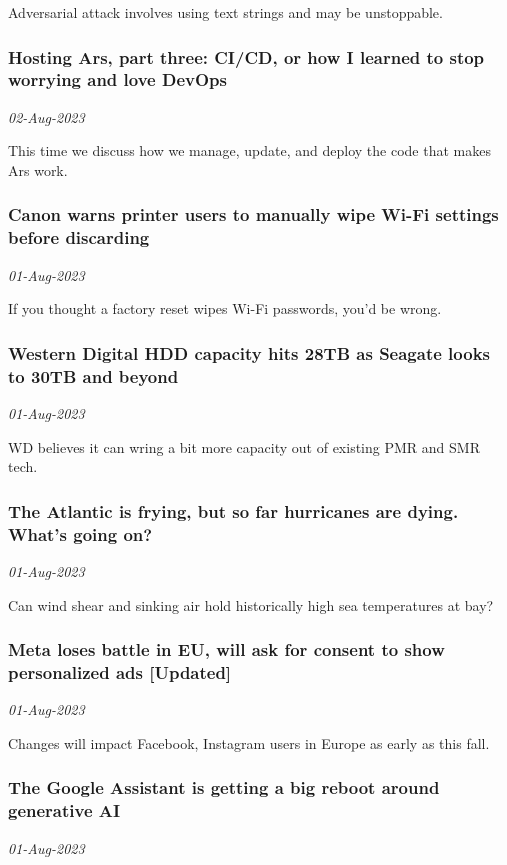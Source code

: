 Adversarial attack involves using text strings and may be unstoppable.
\subsubsection{Hosting Ars, part three: CI/CD, or how I learned to stop worrying and love DevOps \href{https://arstechnica.com/?p=1956002}{}}
\textit{02-Aug-2023}

This time we discuss how we manage, update, and deploy the code that makes Ars work.
\subsubsection{Canon warns printer users to manually wipe Wi-Fi settings before discarding \href{https://arstechnica.com/?p=1958242}{}}
\textit{01-Aug-2023}

If you thought a factory reset wipes Wi-Fi passwords, you'd be wrong.
\subsubsection{Western Digital HDD capacity hits 28TB as Seagate looks to 30TB and beyond \href{https://arstechnica.com/?p=1958232}{}}
\textit{01-Aug-2023}

WD believes it can wring a bit more capacity out of existing PMR and SMR tech.
\subsubsection{The Atlantic is frying, but so far hurricanes are dying. What’s going on? \href{https://arstechnica.com/?p=1958160}{}}
\textit{01-Aug-2023}

Can wind shear and sinking air hold historically high sea temperatures at bay?
\subsubsection{Meta loses battle in EU, will ask for consent to show personalized ads [Updated] \href{https://arstechnica.com/?p=1958197}{}}
\textit{01-Aug-2023}

Changes will impact Facebook, Instagram users in Europe as early as this fall.
\subsubsection{The Google Assistant is getting a big reboot around generative AI \href{https://arstechnica.com/?p=1958080}{}}
\textit{01-Aug-2023}

